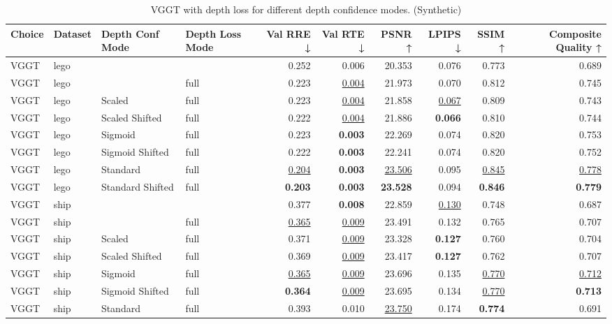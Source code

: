 \begin{table}[H]
\caption{\ifdefined\customcaption \customcaption \else VGGT with depth loss for different depth confidence modes. (Synthetic) \fi}
\label{tab:05_depth_conf_mode_synthetic}
\centering
\scriptsize
\begin{tabular}{llllrrrrrr}
\toprule
Choice & Dataset & Depth Conf Mode & Depth Loss Mode & Val RRE ↓ & Val RTE ↓ & PSNR ↑ & LPIPS ↓ & SSIM ↑ & Composite Quality ↑ \\
\midrule
VGGT & lego &  &  & 0.252 & 0.006 & 20.353 & 0.076 & 0.773 & 0.689 \\
VGGT & lego &  & full & 0.223 & \underline{0.004} & 21.973 & 0.070 & 0.812 & 0.745 \\
VGGT & lego & Scaled & full & 0.223 & \underline{0.004} & 21.858 & \underline{0.067} & 0.809 & 0.743 \\
VGGT & lego & Scaled Shifted & full & 0.222 & \underline{0.004} & 21.886 & \textbf{0.066} & 0.810 & 0.744 \\
VGGT & lego & Sigmoid & full & 0.223 & \textbf{0.003} & 22.269 & 0.074 & 0.820 & 0.753 \\
VGGT & lego & Sigmoid Shifted & full & 0.222 & \textbf{0.003} & 22.241 & 0.074 & 0.820 & 0.752 \\
VGGT & lego & Standard & full & \underline{0.204} & \textbf{0.003} & \underline{23.506} & 0.095 & \underline{0.845} & \underline{0.778} \\
VGGT & lego & Standard Shifted & full & \textbf{0.203} & \textbf{0.003} & \textbf{23.528} & 0.094 & \textbf{0.846} & \textbf{0.779} \\
\midrule
VGGT & ship &  &  & 0.377 & \textbf{0.008} & 22.859 & \underline{0.130} & 0.748 & 0.687 \\
VGGT & ship &  & full & \underline{0.365} & \underline{0.009} & 23.491 & 0.132 & 0.765 & 0.707 \\
VGGT & ship & Scaled & full & 0.371 & \underline{0.009} & 23.328 & \textbf{0.127} & 0.760 & 0.704 \\
VGGT & ship & Scaled Shifted & full & 0.369 & \underline{0.009} & 23.417 & \textbf{0.127} & 0.762 & 0.707 \\
VGGT & ship & Sigmoid & full & \underline{0.365} & \underline{0.009} & 23.696 & 0.135 & \underline{0.770} & \underline{0.712} \\
VGGT & ship & Sigmoid Shifted & full & \textbf{0.364} & \underline{0.009} & 23.695 & 0.134 & \underline{0.770} & \textbf{0.713} \\
VGGT & ship & Standard & full & 0.393 & 0.010 & \underline{23.750} & 0.174 & \textbf{0.774} & 0.691 \\

\end{tabular}
\end{table}
